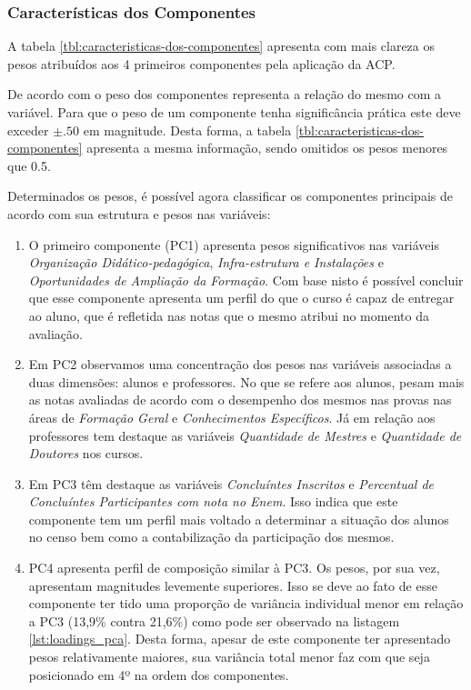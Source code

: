 \subsubsection{Características dos Componentes}
A tabela \ref{tbl:caracteristicas-dos-componentes} apresenta com mais clareza os pesos atribuídos aos 4 primeiros componentes pela aplicação da ACP.



De acordo com  o peso dos componentes representa a relação do mesmo com a variável. Para que o peso de um componente tenha significância prática este deve exceder $\pm.50$ em magnitude. Desta forma, a tabela \ref{tbl:caracteristicas-dos-componentes} apresenta a mesma informação, sendo omitidos os pesos menores que 0.5.



Determinados os pesos, é possível agora classificar os componentes principais de acordo com sua estrutura e pesos nas variáveis:

\begin{enumerate}
\item O primeiro componente (PC1) apresenta pesos significativos nas variáveis  \textit{Organização Didático-pedagógica}, \textit{Infra-estrutura e Instalações} e \textit{Oportunidades de Ampliação da Formação}. Com base nisto é possível concluir que esse componente apresenta um perfil do que o curso é capaz de entregar ao aluno, que é refletida nas notas que o mesmo atribui no momento da avaliação.
\item Em PC2 observamos uma concentração dos pesos nas variáveis associadas a duas dimensões: alunos e professores. No que se refere aos alunos, pesam mais as notas avaliadas de acordo com o desempenho dos mesmos nas provas nas áreas de \textit{Formação Geral} e \textit{Conhecimentos Específicos}. Já em relação aos professores tem destaque as variáveis \textit{Quantidade de Mestres} e \textit{Quantidade de Doutores} nos cursos.
\item Em PC3 têm destaque as variáveis \textit{Concluíntes Inscritos} e \textit{Percentual de Concluíntes Participantes com nota no Enem}. Isso indica que este componente tem um perfil mais voltado a determinar a situação dos alunos no censo bem como a contabilização da participação dos mesmos.
\item PC4 apresenta perfil de composição similar à PC3. Os pesos, por sua vez, apresentam magnitudes levemente superiores. Isso se deve ao fato de esse componente ter tido uma proporção de variância individual menor em relação a PC3 (13,9\% contra 21,6\%) como pode ser observado na listagem \ref{lst:loadings_pca}. Desta forma, apesar de este componente ter apresentado pesos relativamente maiores, sua variância total menor faz com que seja posicionado em 4º na ordem dos componentes.
\end{enumerate}

